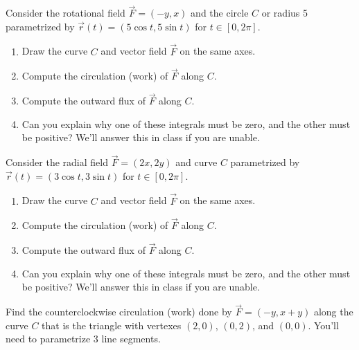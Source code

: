 \begin{problem}
%
 Consider the rotational field $\vec F=(-y,x)$ and the circle $C$ or radius 5 parametrized by $\vec r(t)=(5\cos t, 5\sin t)$ for $t\in[0,2\pi]$.  
\begin{enumerate}
 \item Draw the curve $C$ and vector field $\vec F$ on the same axes.
 \item Compute the circulation (work) of $\vec F$ along $C$.
 \item Compute the outward flux of $\vec F$ along $C$.
 \item Can you explain why one of these integrals must be zero, and the other must be positive? We'll answer this in class if you are unable.
\end{enumerate}

\end{problem}

\begin{problem}
 Consider the radial field $\vec F=(2x,2y)$ and curve $C$ parametrized by $\vec r(t)=(3\cos t, 3\sin t)$ for $t\in[0,2\pi]$.  
\begin{enumerate}
 \item Draw the curve $C$ and vector field $\vec F$ on the same axes.
 \item Compute the circulation (work) of $\vec F$ along $C$.
 \item Compute the outward flux of $\vec F$ along $C$.
 \item Can you explain why one of these integrals must be zero, and the other must be positive? We'll answer this in class if you are unable.
\end{enumerate}

\end{problem}


\begin{problem}
%
Find the counterclockwise circulation (work) done by $\vec F=(-y,x+y)$ along the curve $C$ that is the triangle with vertexes  $(2,0)$, $(0,2)$, and $(0,0)$.  You'll need to parametrize 3 line segments. 
\end{problem}


